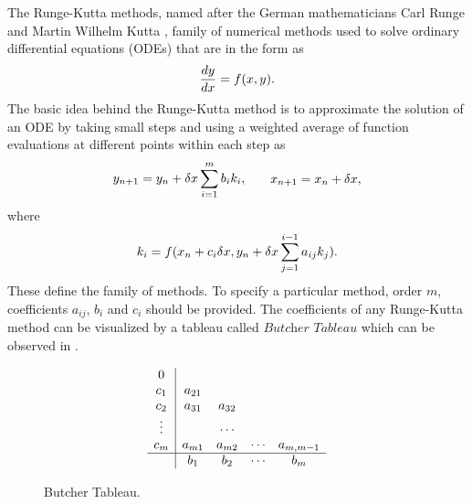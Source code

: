 \documentclass[a4paper,oneside,12pt]{report}
\numberwithin{equation}{chapter}
\begin{document}
The Runge-Kutta methods, named after the German mathematicians Carl Runge and Martin Wilhelm Kutta \cite{runge} \cite{kutta}, 
family of numerical methods
used to solve ordinary differential equations (ODEs) that are in the form as
\vspace{-10pt}\begin{equation} \label{eq:first-order-ODE}
    \deriv{y}{x} = f(x, y) .
\vspace{-10pt}\end{equation}
The basic idea behind the Runge-Kutta method is to approximate the solution of an ODE by taking small steps and using a weighted average 
of function evaluations at different points within each step as
\vspace{-10pt}\begin{equation} \label{eq:general-rk}
    \begin{aligned}
        y_{n+1} = y_n + \delta x \sum_{i=1}^{m} b_i k_i  ,
    \end{aligned}
    \qquad
    \begin{aligned}
        x_{n+1} = x_n + \delta x   ,
    \end{aligned}
\vspace{-10pt}\end{equation}
where 
\vspace{-10pt}\begin{eqnarray} \label{eq:general-rk-coef}
    k_i = f(x_n + c_i \delta x, y_n + \delta x \sum_{j = 1}^{i - 1}a_{ij}k_j) .
\vspace{-10pt}\end{eqnarray}
These  define the family of methods. To specify a particular method, order $m$, coefficients $a_{ij}$, $b_i$ and $c_i$ should be provided.
The coefficients of any Runge-Kutta method can be visualized by a tableau called $\textit{Butcher Tableau}$ which can be observed in .
\begin{figure}[h!]
    \[ 
    \begin{array} 
        {c|cccc}
        0\\
        c_1 & a_{21} \\
        c_2 & a_{31} & a_{32}\\
        \vdots& & \cdots& \\
        c_m & a_{m1} & a_{m2} & \cdots & a_{m,m-1}\\
        \hline
        & b_1 & b_2 &\cdots & b_m
    \end{array}
    \]
    \caption{Butcher Tableau.}
    \label{fig:Butcher}
\end{figure}
\end{document}
